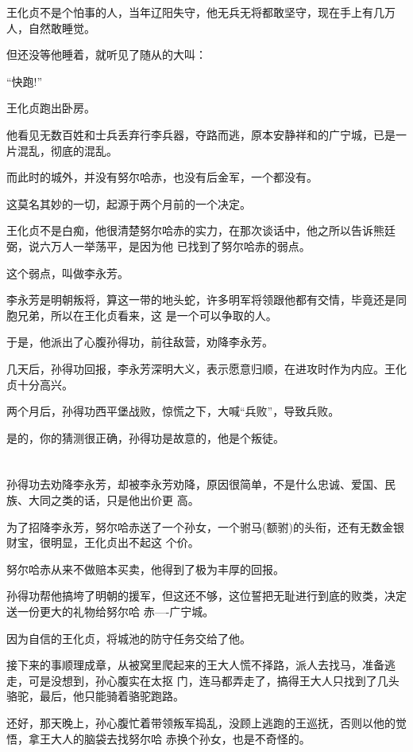 \documentclass[11pt,a4paper,onecolumn]{article}
\begin{document}
王化贞不是个怕事的人，当年辽阳失守，他无兵无将都敢坚守，现在手上有几万人，自然敢睡觉。

但还没等他睡着，就听见了随从的大叫：

``快跑!''

王化贞跑出卧房。

他看见无数百姓和士兵丢弃行李兵器，夺路而逃，原本安静祥和的广宁城，已是一片混乱，彻底的混乱。

而此时的城外，并没有努尔哈赤，也没有后金军，一个都没有。

这莫名其妙的一切，起源于两个月前的一个决定。

王化贞不是白痴，他很清楚努尔哈赤的实力，在那次谈话中，他之所以告诉熊廷弼，说六万人一举荡平，是因为他
已找到了努尔哈赤的弱点。

这个弱点，叫做李永芳。

李永芳是明朝叛将，算这一带的地头蛇，许多明军将领跟他都有交情，毕竟还是同胞兄弟，所以在王化贞看来，这
是一个可以争取的人。

于是，他派出了心腹孙得功，前往敌营，劝降李永芳。

几天后，孙得功回报，李永芳深明大义，表示愿意归顺，在进攻时作为内应。王化贞十分高兴。

两个月后，孙得功西平堡战败，惊慌之下，大喊``兵败''，导致兵败。

是的，你的猜测很正确，孙得功是故意的，他是个叛徒。

\section[\thesection]{}

孙得功去劝降李永芳，却被李永芳劝降，原因很简单，不是什么忠诚、爱国、民族、大同之类的话，只是他出价更
高。

为了招降李永芳，努尔哈赤送了一个孙女，一个驸马(额驸)的头衔，还有无数金银财宝，很明显，王化贞出不起这
个价。

努尔哈赤从来不做赔本买卖，他得到了极为丰厚的回报。

孙得功帮他搞垮了明朝的援军，但这还不够，这位誓把无耻进行到底的败类，决定送一份更大的礼物给努尔哈
赤----广宁城。

因为自信的王化贞，将城池的防守任务交给了他。

接下来的事顺理成章，从被窝里爬起来的王大人慌不择路，派人去找马，准备逃走，可是没想到，孙心腹实在太抠
门，连马都弄走了，搞得王大人只找到了几头骆驼，最后，他只能骑着骆驼跑路。

还好，那天晚上，孙心腹忙着带领叛军捣乱，没顾上逃跑的王巡抚，否则以他的觉悟，拿王大人的脑袋去找努尔哈
赤换个孙女，也是不奇怪的。
\end{document}
